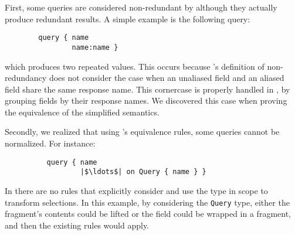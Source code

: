 First, some queries are considered non-redundant by \HP although they actually produce redundant results.
A simple example is the following query:

\begin{verbatim}
        query { name
                name:name }
\end{verbatim}
which produces two repeated values. This occurs because \HP's definition of non-redundancy does not consider the case when an unaliased field and an aliased field share the same response name. This cornercase is properly handled in \gcoql, by grouping fields by their response names. We discovered this case when proving the equivalence of the simplified semantics.

Secondly, we realized that using \HP's equivalence rules, some queries cannot be normalized.
For instance:
\begin{verbatim}
          query { name
                  |$\ldots$| on Query { name } }
\end{verbatim}
In \HP there are no rules that explicitly consider and use the type in scope to transform selections. In this example, by considering the \texttt{Query} type, either the fragment's contents could be lifted or the field could be wrapped in a fragment, and then the existing rules would apply. 


